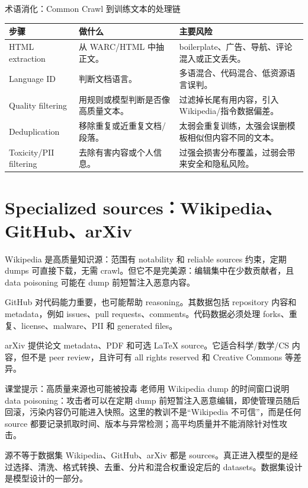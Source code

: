 \documentclass[a4paper]{article}
\begin{document}
\begin{knowledgebox}{术语消化：Common Crawl 到训练文本的处理链}
\begin{tabular}{L{0.22\textwidth}L{0.34\textwidth}L{0.34\textwidth}}
\toprule
步骤 & 做什么 & 主要风险 \\
\midrule
HTML extraction & 从 WARC/HTML 中抽正文。 & boilerplate、广告、导航、评论混入或正文丢失。 \\
Language ID & 判断文档语言。 & 多语混合、代码混合、低资源语言误判。 \\
Quality filtering & 用规则或模型判断是否像高质量文本。 & 过滤掉长尾有用内容，引入 Wikipedia/指令数据偏差。 \\
Deduplication & 移除重复或近重复文档/段落。 & 太弱会重复训练，太强会误删模板相似但内容不同的文本。 \\
Toxicity/PII filtering & 去除有害内容或个人信息。 & 过强会损害分布覆盖，过弱会带来安全和隐私风险。 \\
\bottomrule
\end{tabular}
\end{knowledgebox}

\section{Specialized sources：Wikipedia、GitHub、arXiv}

Wikipedia 是高质量知识源：范围有 notability 和 reliable sources 约束，定期 dumps 可直接下载，无需 crawl。但它不是完美源：编辑集中在少数贡献者，且 data poisoning 可能在 dump 前短暂注入恶意内容。

GitHub 对代码能力重要，也可能帮助 reasoning。其数据包括 repository 内容和 metadata，例如 issues、pull requests、comments。代码数据必须处理 forks、重复、license、malware、PII 和 generated files。

arXiv 提供论文 metadata、PDF 和可选 LaTeX source。它适合科学/数学/CS 内容，但不是 peer review，且许可有 all rights reserved 和 Creative Commons 等差异。

\begin{warningbox}{课堂提示：高质量来源也可能被投毒}
老师用 Wikipedia dump 的时间窗口说明 data poisoning：攻击者可以在定期 dump 前短暂注入恶意编辑，即使管理员随后回滚，污染内容仍可能进入快照。这里的教训不是“Wikipedia 不可信”，而是任何 source 都要记录抓取时间、版本与异常检测；高平均质量并不能消除针对性攻击。
\end{warningbox}

\begin{importantbox}{源不等于数据集}
Wikipedia、GitHub、arXiv 都是 sources。真正进入模型的是经过选择、清洗、格式转换、去重、分片和混合权重设定后的 datasets。数据集设计是模型设计的一部分。
\end{importantbox}
\end{document}
